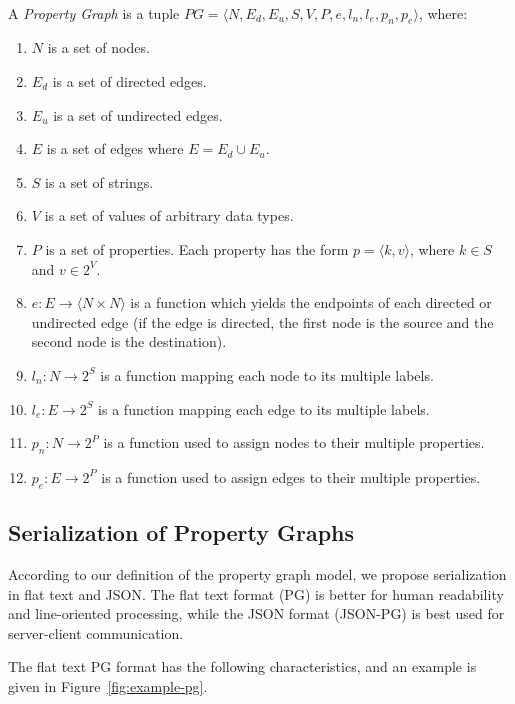 \documentclass[runningheads]{llncs}
\begin{document}
\begin{defi}
\leavevmode \vspace{1mm} \\
A \emph{Property Graph} is a tuple
$PG = \langle N, E_d, E_u, S, V, P, e, l_n, l_e, p_n, p_e\rangle$, where:
\begin{enumerate}
    \item $N$ is a set of nodes.
    \item $E_d$ is a set of directed edges.
    \item $E_u$ is a set of undirected edges.
    \item $E$ is a set of edges where $E = E_d \cup E_u$.
    \item $S$ is a set of strings.
    \item $V$ is a set of values of arbitrary data types.
    \item $P$ is a set of properties. Each property has the form $p = \langle k,v \rangle$, where $k \in S$ and $v \in 2^V$.
    \item $e: E \to \langle N \times N \rangle$ is a function which yields the endpoints of each directed or undirected edge (if the edge is directed, the first node is the source and the second node is the destination).
    \item $l_n : N \to 2^S$ is a function mapping each node to its multiple labels.
    \item $l_e : E \to 2^S$ is a function mapping each edge to its multiple labels.
    \item $p_n : N \to 2^P$ is a function used to assign nodes to their multiple properties.
    \item $p_e : E \to 2^P$ is a function used to assign edges to their multiple properties.
\end{enumerate}
\end{defi}


\subsection{Serialization of Property Graphs}
According to our definition of the property graph model, we propose serialization in flat text and JSON. The flat text format (PG) is better for human readability and line-oriented processing, while the JSON format (JSON-PG) is best used for server-client communication.

The flat text PG format has the following characteristics, and an example is given in Figure~\ref{fig:example-pg}.
\end{document}
